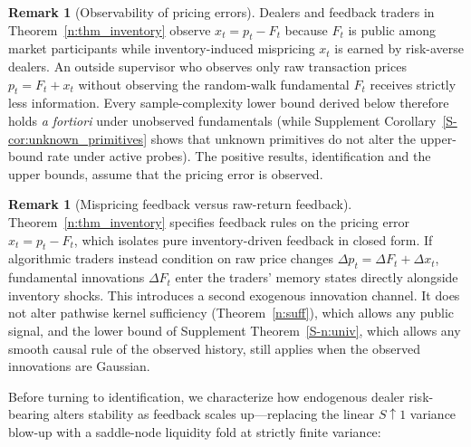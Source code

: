 \documentclass[11pt,letterpaper]{article}
\theoremstyle{definition}
\newtheorem{remark}[theorem]{Remark}
\begin{document}
\begin{remark}[Observability of pricing errors]\label{rem:obs}
Dealers and feedback traders in Theorem~\ref{n:thm_inventory} observe $x_t = p_t - F_t$ because $F_t$ is public among market participants while inventory-induced mispricing $x_t$ is earned by risk-averse dealers. An outside supervisor who observes only raw transaction prices $p_t = F_t + x_t$ without observing the random-walk fundamental $F_t$ receives strictly less information. Every sample-complexity lower bound derived below therefore holds \emph{a fortiori} under unobserved fundamentals (while Supplement Corollary~\ref{S-cor:unknown_primitives} shows that unknown primitives do not alter the upper-bound rate under active probes). The positive results, identification and the upper bounds, assume that the pricing error is observed.
\end{remark}

\begin{remark}[Mispricing feedback versus raw-return feedback]\label{rem:returns}
Theorem~\ref{n:thm_inventory} specifies feedback rules on the pricing error $x_t = p_t - F_t$, which isolates pure inventory-driven feedback in closed form. If algorithmic traders instead condition on raw price changes $\Delta p_t = \Delta F_t + \Delta x_t$, fundamental innovations $\Delta F_t$ enter the traders' memory states directly alongside inventory shocks. This introduces a second exogenous innovation channel. It does not alter pathwise kernel sufficiency (Theorem~\ref{n:suff}), which allows any public signal, and the lower bound of Supplement Theorem~\ref{S-n:univ}, which allows any smooth causal rule of the observed history, still applies when the observed innovations are Gaussian.
\end{remark}

Before turning to identification, we characterize how endogenous dealer risk-bearing alters stability as feedback scales up---replacing the linear $S \uparrow 1$ variance blow-up with a saddle-node liquidity fold at strictly finite variance:
\end{document}
